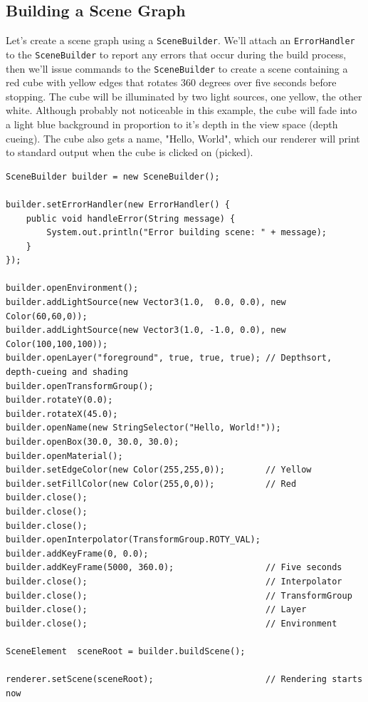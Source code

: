 \documentclass[10pt,aps, prb,preprint]{article}
\begin{document}
\subsection{Building a Scene Graph}
Let's create a scene graph using a \texttt{SceneBuilder}. We'll attach an \texttt{ErrorHandler} to the \texttt{SceneBuilder} to report any errors that occur during the build process, then we'll issue commands to the \texttt{SceneBuilder} to create a scene containing a red cube with yellow edges that rotates 360 degrees over five seconds before stopping. The cube will be illuminated by two light sources, one yellow, the other white. Although probably not noticeable in this example, the cube will fade into a light blue background in proportion to it's depth in the view space (depth cueing). The cube also gets a name, "Hello, World", which our renderer will print to standard output when the cube is clicked on (picked). 

\begin{verbatim}
SceneBuilder builder = new SceneBuilder();

builder.setErrorHandler(new ErrorHandler() {
    public void handleError(String message) {
        System.out.println("Error building scene: " + message);
    }
});

builder.openEnvironment();
builder.addLightSource(new Vector3(1.0,  0.0, 0.0), new Color(60,60,0));
builder.addLightSource(new Vector3(1.0, -1.0, 0.0), new Color(100,100,100));
builder.openLayer("foreground", true, true, true); // Depthsort, depth-cueing and shading
builder.openTransformGroup();
builder.rotateY(0.0);
builder.rotateX(45.0);
builder.openName(new StringSelector("Hello, World!"));
builder.openBox(30.0, 30.0, 30.0);
builder.openMaterial();
builder.setEdgeColor(new Color(255,255,0));        // Yellow
builder.setFillColor(new Color(255,0,0));          // Red
builder.close();
builder.close();
builder.close();
builder.openInterpolator(TransformGroup.ROTY_VAL);
builder.addKeyFrame(0, 0.0); 
builder.addKeyFrame(5000, 360.0);                  // Five seconds
builder.close();                                   // Interpolator
builder.close();                                   // TransformGroup
builder.close();                                   // Layer
builder.close();                                   // Environment

SceneElement  sceneRoot = builder.buildScene();

renderer.setScene(sceneRoot);                      // Rendering starts now
\end{verbatim}
\end{document}
